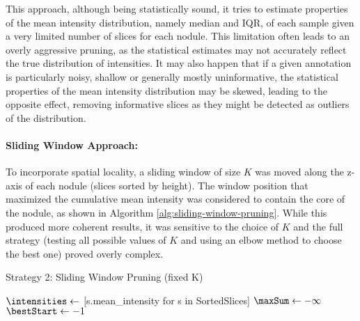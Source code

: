 This approach, although being statistically sound, it tries to estimate properties of the mean intensity distribution, namely median and IQR, of each sample given a very limited number of slices for each nodule. This limitation often leads to an overly aggressive pruning, as the statistical estimates may not accurately reflect the true distribution of intensities.
It may also happen that if a given annotation is particularly noisy, shallow or generally mostly uninformative, the statistical properties of the mean intensity distribution may be skewed, leading to the opposite effect, removing informative slices as they might be detected as outliers of the distribution.

\paragraph{Sliding Window Approach:} To incorporate spatial locality, a sliding window of size $K$ was moved along the z-axis of each nodule (slices sorted by height). The window position that maximized the cumulative mean intensity was considered to contain the core of the nodule, as shown in Algorithm \ref{alg:sliding-window-pruning}. While this produced more coherent results, it was sensitive to the choice of $K$ and the full strategy (testing all possible values of $K$ and using an elbow method to choose the best one) proved overly complex.

\begin{algorithm}[H]
    \caption{Strategy 2: Sliding Window Pruning (fixed K)}
    \label{alg:sliding-window-pruning}
    \DontPrintSemicolon
    \SetAlgoLined
    

    \BlankLine
    
    $\intensities \gets$ [s.mean\_intensity for s in SortedSlices]\;
    $\maxSum \gets -\infty$\;
    $\bestStart \gets -1$\;
    
    \;
\end{algorithm}

